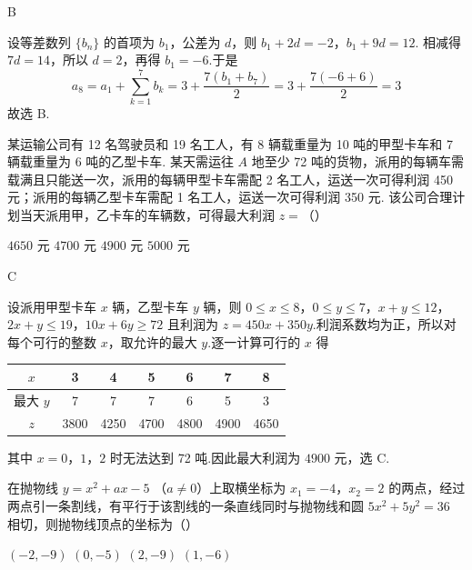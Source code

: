 \begin{answer}
B
\end{answer}

\begin{solution}
设等差数列 \(\{b_n\}\) 的首项为 \(b_1\)，公差为 \(d\)，则
\(b_1+2d=-2\)，\(b_1+9d=12\).
相减得 \(7d=14\)，所以 \(d=2\)，再得 \(b_1=-6\).于是
\[
a_8=a_1+\sum_{k=1}^{7}b_k
 =3+\frac{7(b_1+b_7)}{2}
 =3+\frac{7(-6+6)}{2}=3
\]
故选 B.
\end{solution}

\begin{problem}
某运输公司有 12 名驾驶员和 19 名工人，有 8 辆载重量为 10 吨的甲型卡车和 7 辆载重量为 6 吨的乙型卡车. 某天需运往 \(A\) 地至少 72 吨的货物，派用的每辆车需载满且只能送一次，派用的每辆甲型卡车需配 2 名工人，运送一次可得利润 450 元；派用的每辆乙型卡车需配 1 名工人，运送一次可得利润 350 元. 该公司合理计划当天派用甲，乙卡车的车辆数，可得最大利润 \(z =\)（\quad）

\choices
    {\(4650\text{ 元}\)}
    {\(4700\text{ 元}\)}
    {\(4900\text{ 元}\)}
    {\(5000\text{ 元}\)}
\end{problem}

\begin{answer}
C
\end{answer}

\begin{solution}
设派用甲型卡车 \(x\) 辆，乙型卡车 \(y\) 辆，则
\(0\leqslant x\leqslant8\)，\(0\leqslant y\leqslant7\)，\(x+y\leqslant12\)，\(2x+y\leqslant19\)，\(10x+6y\geqslant72\)
且利润为 \(z=450x+350y\).利润系数均为正，所以对每个可行的整数 \(x\)，取允许的最大 \(y\).逐一计算可行的 \(x\) 得
\begin{center}
\begin{tabular}{c|cccccc}
\(x\) & 3 & 4 & 5 & 6 & 7 & 8\\ \hline
最大 \(y\) & 7 & 7 & 7 & 6 & 5 & 3\\
\(z\) & 3800 & 4250 & 4700 & 4800 & 4900 & 4650
\end{tabular}
\end{center}
其中 \(x=0\)，\(1\)，\(2\) 时无法达到 72 吨.因此最大利润为 \(4900\) 元，选 C.
\end{solution}

\begin{problem}
在抛物线 \( y = x^{2} + ax - 5\) （\(a \neq 0\)）上取横坐标为 \(x_{1} = -4\)，\(x_{2} = 2\) 的两点，经过两点引一条割线，有平行于该割线的一条直线同时与抛物线和圆 \( 5x^{2} + 5y^{2} = 36 \) 相切，则抛物线顶点的坐标为（\quad）

\choices
    {\((-2, -9)\)}
    {\((0, -5)\)}
    {\((2, -9)\)}
    {\((1, -6)\)}
\end{problem}

